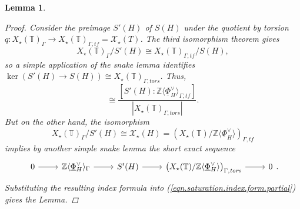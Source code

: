 \documentclass[openany]{amsbook}
\newtheorem{lemma}[theorem]{Lemma}
\theoremstyle{definition}
\theoremstyle{remark}
\numberwithin{equation}{section}
\newcommand{\Z}{\mathbb{Z}}
\newcommand{\T}{\mathbb{T}}
\newcommand{\cX}{\mathcal{X}}
\newcommand{\ul}[1]{\underline{#1}}
\renewcommand{\-}{\operatorname{-}}
\newcommand{\tors}{\mathit{tors}}
\newcommand{\tf}{\mathit{tf}}
\begin{document}
\begin{lemma}
\begin{proof}
        Consider the preimage $S'(H)$ of $S(H)$ under the quotient by torsion $q : X_\star(\T)_{\Gamma} \to X_\star(\T)_{\Gamma, \tf} = \cX_\star(T)$. The third isomorphism theorem gives
        $$
            X_\star(\T)_{\Gamma}/S'(H) \cong X_\star(\T)_{\Gamma, \tf}/S(H),
        $$
        so a simple application of the snake lemma identifies $\ker(S'(H) \to S(H)) \cong X_\star(\T)_{\Gamma, \tors}$. Thus, 
        \begin{equation}
            [S(H) : \Z\langle \ul{\Phi}^\vee_{H} \rangle_{\Gamma, \tf}] \cong \frac{[S'(H) : \Z\langle \ul{\Phi}^\vee_{H} \rangle_{\Gamma, \tf}]}{|X_\star(\T)_{\Gamma, \tors}|}.\label{eqn.saturation.index.form.partial}
        \end{equation}
        But on the other hand, the isomorphism 
        $$
            X_\star(\T)_{\Gamma}/S'(H) \cong \cX_\star(H) = \left(X_\star(\T)/\Z\langle \ul{\Phi}^\vee_{H} \rangle\right)_{\Gamma, \tf}
        $$
        implies by another simple snake lemma the short exact sequence
        $$
            \begin{tikzcd}
                0 \ar[r] & \Z\langle \ul{\Phi}^\vee_{H} \rangle_{\Gamma} \ar[r] & S'(H) \ar[r] & \left(X_\star(\T)/\Z\langle \ul{\Phi}^\vee_{H} \rangle\right)_{\Gamma, \tors} \ar[r] & 0
            \end{tikzcd}.
        $$
        Substituting the resulting index formula into (\ref{eqn.saturation.index.form.partial}) gives the Lemma.
    \end{proof}
\end{lemma}
\end{document}
